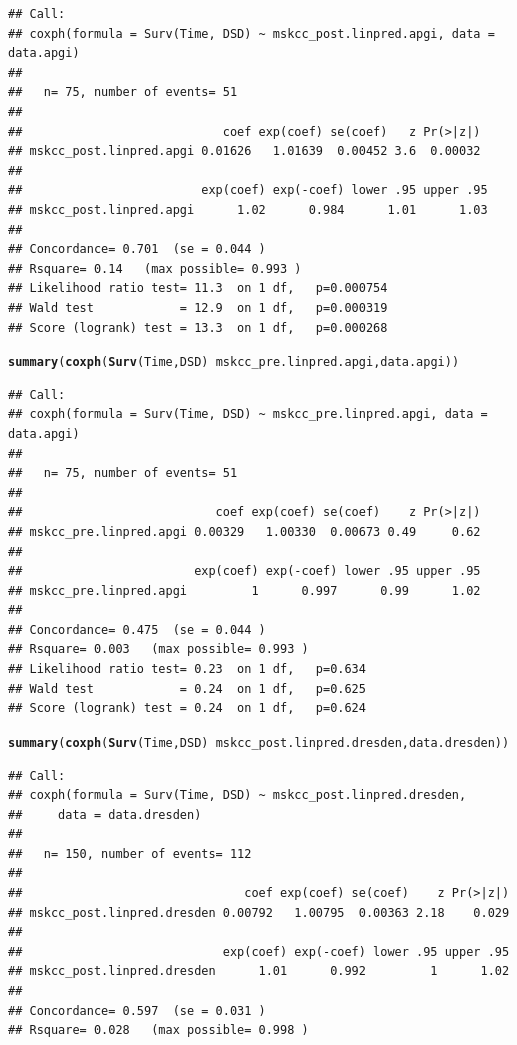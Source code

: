 \documentclass{article}\usepackage[]{graphicx}\usepackage[]{color}
\makeatletter
\newcommand{\hlopt}[1]{\textcolor[rgb]{0,0,0}{#1}}%
\newcommand{\hlstd}[1]{\textcolor[rgb]{0.345,0.345,0.345}{#1}}%
\newcommand{\hlkwd}[1]{\textcolor[rgb]{0.737,0.353,0.396}{\textbf{#1}}}%
\newenvironment{kframe}{%
 \def\at@end@of@kframe{}%
 \ifinner\ifhmode%
  \def\at@end@of@kframe{\end{minipage}}%
  \begin{minipage}{\columnwidth}%
 \fi\fi%
 \def\FrameCommand##1{\hskip\@totalleftmargin \hskip-\fboxsep
 \colorbox{shadecolor}{##1}\hskip-\fboxsep
     \hskip-\linewidth \hskip-\@totalleftmargin \hskip\columnwidth}%
 \MakeFramed {\advance\hsize-\width
   \@totalleftmargin\z@ \linewidth\hsize
   \@setminipage}}%
 {\par\unskip\endMakeFramed%
 \at@end@of@kframe}
\newenvironment{knitrout}{}{} %
\makeatother
\begin{document}
\begin{knitrout}
\begin{kframe}
\begin{alltt}
\end{alltt}
\begin{verbatim}
## Call:
## coxph(formula = Surv(Time, DSD) ~ mskcc_post.linpred.apgi, data = data.apgi)
## 
##   n= 75, number of events= 51 
## 
##                            coef exp(coef) se(coef)   z Pr(>|z|)
## mskcc_post.linpred.apgi 0.01626   1.01639  0.00452 3.6  0.00032
## 
##                         exp(coef) exp(-coef) lower .95 upper .95
## mskcc_post.linpred.apgi      1.02      0.984      1.01      1.03
## 
## Concordance= 0.701  (se = 0.044 )
## Rsquare= 0.14   (max possible= 0.993 )
## Likelihood ratio test= 11.3  on 1 df,   p=0.000754
## Wald test            = 12.9  on 1 df,   p=0.000319
## Score (logrank) test = 13.3  on 1 df,   p=0.000268
\end{verbatim}
\begin{alltt}
\hlkwd{summary}\hlstd{(}\hlkwd{coxph}\hlstd{(}\hlkwd{Surv}\hlstd{(Time, DSD)} \hlopt{~} \hlstd{mskcc_pre.linpred.apgi, data.apgi))}
\end{alltt}
\begin{verbatim}
## Call:
## coxph(formula = Surv(Time, DSD) ~ mskcc_pre.linpred.apgi, data = data.apgi)
## 
##   n= 75, number of events= 51 
## 
##                           coef exp(coef) se(coef)    z Pr(>|z|)
## mskcc_pre.linpred.apgi 0.00329   1.00330  0.00673 0.49     0.62
## 
##                        exp(coef) exp(-coef) lower .95 upper .95
## mskcc_pre.linpred.apgi         1      0.997      0.99      1.02
## 
## Concordance= 0.475  (se = 0.044 )
## Rsquare= 0.003   (max possible= 0.993 )
## Likelihood ratio test= 0.23  on 1 df,   p=0.634
## Wald test            = 0.24  on 1 df,   p=0.625
## Score (logrank) test = 0.24  on 1 df,   p=0.624
\end{verbatim}
\begin{alltt}
\hlkwd{summary}\hlstd{(}\hlkwd{coxph}\hlstd{(}\hlkwd{Surv}\hlstd{(Time, DSD)} \hlopt{~} \hlstd{mskcc_post.linpred.dresden, data.dresden))}
\end{alltt}
\begin{verbatim}
## Call:
## coxph(formula = Surv(Time, DSD) ~ mskcc_post.linpred.dresden, 
##     data = data.dresden)
## 
##   n= 150, number of events= 112 
## 
##                               coef exp(coef) se(coef)    z Pr(>|z|)
## mskcc_post.linpred.dresden 0.00792   1.00795  0.00363 2.18    0.029
## 
##                            exp(coef) exp(-coef) lower .95 upper .95
## mskcc_post.linpred.dresden      1.01      0.992         1      1.02
## 
## Concordance= 0.597  (se = 0.031 )
## Rsquare= 0.028   (max possible= 0.998 )

\end{verbatim}
\end{kframe}
\end{knitrout}
\end{document}
